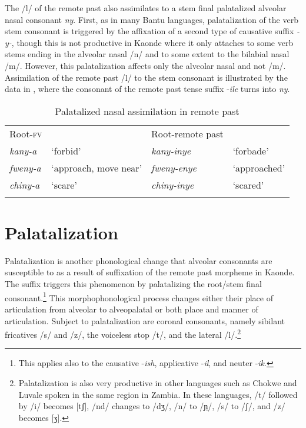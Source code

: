 \documentclass[output=paper]{langsci/langscibook}
\begin{document}
 
The /l/ of the remote past also assimilates to a stem final palatalized alveolar nasal consonant \textit{ny}. First, as in many Bantu languages, palatalization of the verb stem consonant is triggered by the affixation of a second type of causative suffix \textit{-y-}, though this is not productive in Kaonde where it only attaches to some verb stems ending in the alveolar nasal /n/ and to some extent to the bilabial nasal /m/. However, this palatalization affects only the alveolar nasal and not /m/. Assimilation of the remote past /l/ to the stem consonant is illustrated by the data in , where the consonant of the remote past tense suffix -\textit{ile} turns into \textit{ny}.  
 

\begin{table}
\begin{tabular}{llll}
\lsptoprule
Root-\textsc{fv} &  & Root-remote past & \\
\textit{kany-a} & `forbid' & \textit{kany-inye} & `forbade' \\
\textit{fweny-a} & `approach, move near' & \textit{fweny-enye} & `approached' \\
\textit{chiny-a} & `scare' & \textit{chiny-inye} & `scared' \\

\lspbottomrule
\end{tabular}

\caption{Palatalized nasal assimilation in remote past}
\label{tab:8.kawasha}

 \end{table}


\section{Palatalization} \label{§3:palatalization.kawasha}

Palatalization is another phonological change that alveolar consonants are susceptible to as a result of suffixation of the remote past morpheme in Kaonde. The suffix triggers this phenomenon by palatalizing the root/stem final consonant.\footnote{This applies also to the causative -\textit{ish}, applicative -\textit{il}, and neuter -\textit{ik}.} This morphophonological process changes either their place of articulation from alveolar to alveopalatal or both place and manner of articulation. Subject to palatalization are coronal consonants, namely sibilant fricatives /s/ and /z/, the voiceless stop /t/, and the lateral /l/.\footnote{Palatalization is also very productive in other languages such as Chokwe and Luvale spoken in the same region in  Zambia. In these languages, /t/ followed by /i/ becomes [tʃ], /nd/ changes to /dʒ/, /n/ to /\href{http://en.wikipedia.org/wiki/Ɲ}{ɲ}/, /s/ to /ʃ/, and /z/ becomes [ʒ].} 
\end{document}
